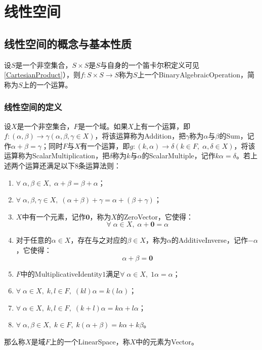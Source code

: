 \section{线性空间}

\subsection{线性空间的概念与基本性质}

\begin{definition}
	设$S$是一个非空集合，$S\times S$是$S$与自身的一个笛卡尔积定义可见\cref{CartesianProduct}），则$f:S\times S\rightarrow S$称为$S$上一个\gls{BinaryAlgebraicOperation}，简称为$S$上的一个运算。
\end{definition}
\subsubsection{线性空间的定义}
\begin{definition}
	设$X$是一个非空集合，$F$是一个域。如果$X$上有一个运算，即$f:(\alpha,\beta)\rightarrow\gamma(\alpha,\beta,\gamma\in X)$，将该运算称为\gls{Addition}，把$\gamma$称为$\alpha$与$\beta$的\gls{Sum}，记作$\alpha+\beta=\gamma$；同时$F$与$X$有一个运算，即$g:(k,\alpha)\rightarrow\delta(k\in F,\;\alpha,\delta\in X)$，将该运算称为\gls{ScalarMultiplication}，把$\delta$称为$k$与$\alpha$的\gls{ScalarMultiple}，记作$k\alpha=\delta$。若上述两个运算还满足以下$8$条运算法则：
	\begin{enumerate}
		\item $\forall\;\alpha,\beta\in X,\;\alpha+\beta=\beta+\alpha$；
		\item $\forall\;\alpha,\beta,\gamma\in X,\;(\alpha+\beta)+\gamma=\alpha+(\beta+\gamma)$；
		\item $X$中有一个元素，记作$\mathbf{0}$，称为$X$的\gls{ZeroVector}，它使得：
		\begin{equation*}
			\forall\;\alpha\in X,\;\alpha+\mathbf{0}=\alpha
		\end{equation*}
		\item 对于任意的$\alpha\in X$，存在与之对应的$\beta\in X$，称为$\alpha$的\gls{AdditiveInverse}，记作$-\alpha$，它使得：
		\begin{equation*}
			\alpha+\beta=\mathbf{0}
		\end{equation*}
		\item $F$中的\gls{MultiplicativeIdentity}$1$满足$\forall\;\alpha\in X,\;1\alpha=\alpha$；
		\item $\forall\;\alpha\in X,\;k,l\in F,\;(kl)\alpha=k(l\alpha)$；
		\item $\forall\;\alpha\in X,\;k,l\in F,\;(k+l)\alpha=k\alpha+l\alpha$；
		\item $\forall\;\alpha,\beta\in X,\;k\in F,\;k(\alpha+\beta)=k\alpha+k\beta$。
	\end{enumerate}
	那么称$X$是域$F$上的一个\gls{LinearSpace}，称$X$中的元素为\gls{Vector}。
\end{definition}
